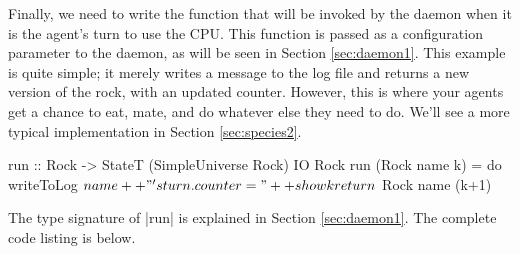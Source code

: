 Finally, we need to write the function that will be
invoked by the daemon when it is the agent's turn to use the CPU.
This function is passed as a configuration parameter to the daemon,
as will be seen in Section \ref{sec:daemon1}.
This example is quite simple;
it merely writes a message to the log file
and returns a new version of the rock, with an updated counter.
However, this is where your agents get a chance to eat, mate, 
and do whatever else they need to do.
We'll see a more typical implementation in Section
\ref{sec:species2}.

\begin{code}
run :: Rock -> StateT (SimpleUniverse Rock) IO Rock
run (Rock name k) = do
  writeToLog $ name ++ "'s turn. counter=" ++ show k 
  return $ Rock name (k+1)
\end{code}

The type signature of |run| is explained in Section \ref{sec:daemon1}.
The complete code listing is below.
\label{code:rock}

